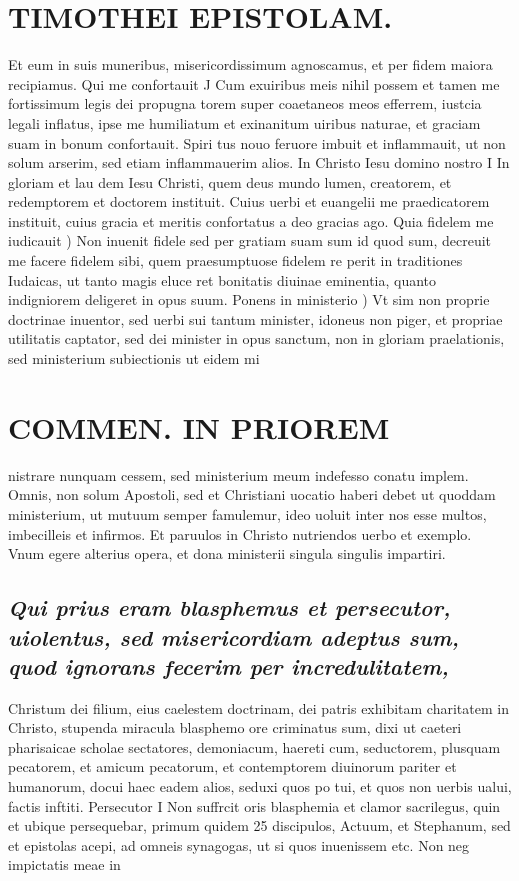\documentclass{article}
\begin{document}
\begin{pages}
\section*{TIMOTHEI EPISTOLAM. }
\marginpar{[ p.25 ]}\pstart Et eum in suis muneribus, misericordissimum agnoscamus, et per fidem maiora recipiamus.  \pend\pstart Qui me confortauit J Cum exuiribus meis nihil possem et tamen me fortissimum legis dei propugna torem super coaetaneos meos efferrem, iustcia legali inflatus, ipse me humiliatum et exinanitum uiribus naturae, et graciam suam in bonum confortauit. Spiri tus nouo feruore imbuit et inflammauit, ut non solum arserim, sed etiam inflammauerim alios.  \pend\pstart In Christo Iesu domino nostro I In gloriam et lau dem Iesu Christi, quem deus mundo lumen, creatorem, et redemptorem et doctorem instituit. Cuius uerbi et euangelii me praedicatorem instituit, cuius gracia et meritis confortatus a deo gracias ago.  \pend\pstart Quia fidelem me iudicauit ) Non inuenit fidele sed per gratiam suam sum id quod sum, decreuit me facere fidelem sibi, quem praesumptuose fidelem re perit in traditiones Iudaicas, ut tanto magis eluce ret bonitatis diuinae eminentia, quanto indigniorem deligeret in opus suum.  \pend\pstart Ponens in ministerio ) Vt sim non proprie doctrinae inuentor, sed uerbi sui tantum minister, idoneus non piger, et propriae utilitatis captator, sed dei minister in opus sanctum, non in gloriam praelationis, sed ministerium subiectionis ut eidem mi\pend
\section*{COMMEN. IN PRIOREM }
\marginpar{[ p.26 ]}\pstart nistrare nunquam cessem, sed ministerium meum indefesso conatu implem. Omnis, non solum Apostoli, sed et Christiani uocatio haberi debet ut quoddam ministerium, ut mutuum semper famulemur, ideo uoluit inter nos esse multos, imbecilleis et infirmos. Et paruulos in Christo nutriendos uerbo et exemplo. Vnum egere alterius opera, et dona ministerii singula singulis impartiri.  \pend
{}
{}
\subsection*{\textit{Qui prius eram blasphemus et persecutor, uiolentus, sed misericordiam adeptus sum, quod ignorans fecerim per incredulitatem, }}\pstart Christum dei filium, eius caelestem doctrinam, dei patris exhibitam charitatem in Christo, stupenda miracula blasphemo ore criminatus sum, dixi ut caeteri pharisaicae scholae sectatores, demoniacum, haereti cum, seductorem, plusquam pecatorem, et amicum pecatorum, et contemptorem diuinorum pariter et humanorum, docui haec eadem alios, seduxi quos po tui, et quos non uerbis ualui, factis inftiti.  \pend\pstart Persecutor I Non suffrcit oris blasphemia et clamor sacrilegus, quin et ubique persequebar, primum quidem 25 discipulos, Actuum, et Stephanum, sed et epistolas acepi, ad omneis synagogas, ut si quos inuenissem etc. Non neg impictatis meae in\pend

\end{pages}
\end{document}
